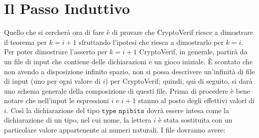 \documentclass[a4paper,openright,twoside,12pt]{report}
\begin{document}
\section{Il Passo Induttivo}
Quello che si cercher\`a ora di fare \`e di provare che CryptoVerif riesce a dimostrare il teorema per $k=i+1$ sfruttando l'ipotesi 
che riesca a dimostrarlo per $k=i$.
Per poter dimostrare l'asserto per $k=i+1$ CryptoVerif, in generale, partir\`a da un file di input che contiene 
delle dichiarazioni e un gioco iniziale. \`E scontato che non avendo a disposizione infinito spazio, non si possa descrivere
un'infinit\`a di file di input (uno per ogni valore di $i$) per CryptoVerif; quindi, qui di seguito, si dar\`a uno schema generale della composizione di questi file. 
Prima di procedere \`e bene notare che nell'input le espressioni $i$ e $i+1$ stanno al posto degli effettivi valori di $i$. 
Cos\`i la dichiarazione del tipo $\texttt{type npibits}$ dovr\`a essere intesa come la dichiarazione di un tipo, nel cui nome, la lettera $i$ 
\`e stata sostituita con un particolare valore appartenente ai numeri naturali. I file dovranno avere:
\end{document}

